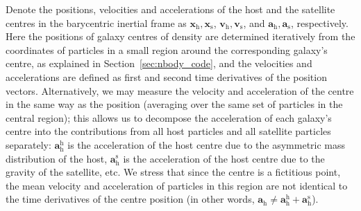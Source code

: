 \documentclass[twocolumn]{aastex63}
\begin{document}
Denote the positions, velocities and accelerations of the host and the satellite centres in the barycentric inertial frame as $\boldsymbol{x}_\mathrm{h}, \boldsymbol{x}_\mathrm{s}$, $\boldsymbol{v}_\mathrm{h}, \boldsymbol{v}_\mathrm{s}$, and $\boldsymbol{a}_\mathrm{h}, \boldsymbol{a}_\mathrm{s}$, respectively. Here the positions of galaxy centres of density are determined iteratively from the coordinates of particles in a small region around the corresponding galaxy's centre, as explained in Section~\ref{sec:nbody_code}, and the velocities and accelerations are defined as first and second time derivatives of the position vectors. Alternatively, we may measure the velocity and acceleration of the centre in the same way as the position (averaging over the same set of particles in the central region); this allows us to decompose the acceleration of each galaxy's centre into the contributions from all host particles and all satellite particles separately: $\boldsymbol{a}_\mathrm{h}^\mathrm{h}$ is the acceleration of the host centre due to the asymmetric mass distribution of the host, $\boldsymbol{a}_\mathrm{h}^\mathrm{s}$ is the acceleration of the host centre due to the gravity of the satellite, etc. We stress that since the centre is a fictitious point, the mean velocity and acceleration of particles in this region are not identical to the time derivatives of the centre position (in other words, $\boldsymbol{a}_\mathrm{h} \ne \boldsymbol{a}_\mathrm{h}^\mathrm{h} + \boldsymbol{a}_\mathrm{h}^\mathrm{s}$).
\end{document}
